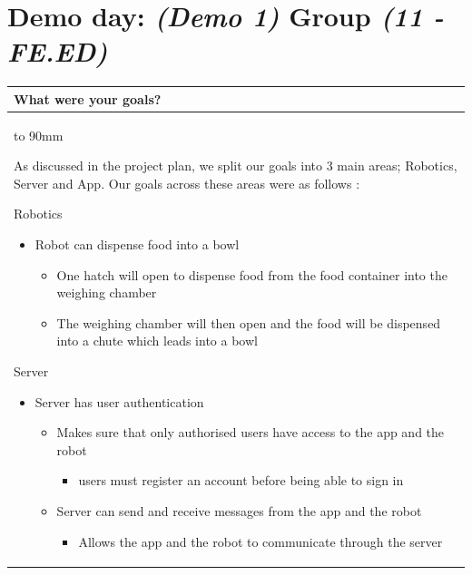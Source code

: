 \documentclass[a4paper]{article}
\newcommand{\colWidth}{141mm}
\begin{document}
 
\section*{Demo day: \textit{(Demo 1)} Group \textit{(11 - FE.ED)}}


\begin{center}
\begin{tabular}{|p{\colWidth}|}
	\hline
	\cellcolor{blue!25}\large
	\textbf{What were your goals?}
	\\ \hline
	\vtop to 90mm{
As discussed in the project plan, we split our goals into 3 main areas; Robotics, Server and App. Our goals across these areas were as follows : \par
\vspace{2mm}
Robotics
\begin{itemize}
    \item Robot can dispense food into a bowl 
    \begin{itemize}
        \item One hatch will open to dispense food from the food container into the weighing chamber
        \item The weighing chamber will then open and the food will be dispensed into a chute which leads into a bowl

    \end{itemize}
\end{itemize}

Server
\begin{itemize}
    \item Server has user authentication
    \begin{itemize}
        \item Makes sure that only authorised users have access to the app and the robot 
        \begin{itemize}
            \item users must register an account before being able to sign in
        \end{itemize}
            

        \item Server can send and receive messages from the app and the robot
        \begin{itemize}
            \item Allows the app and the robot to communicate through the server
        \end{itemize}
    \end{itemize}
        

\end{itemize}}
\end{tabular}
\end{center}
\end{document}
